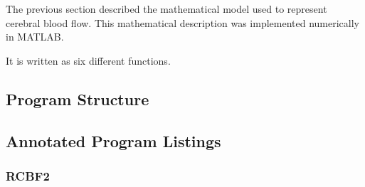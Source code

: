 The previous section described the mathematical model used to
represent cerebral blood flow.  This mathematical description was
implemented numerically in MATLAB.

It is written as six different functions.


\subsection{Program Structure}

\subsection{Annotated Program Listings}

\subsubsection{RCBF2}

